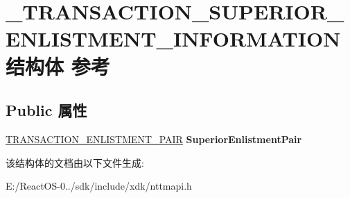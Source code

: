 \hypertarget{struct___t_r_a_n_s_a_c_t_i_o_n___s_u_p_e_r_i_o_r___e_n_l_i_s_t_m_e_n_t___i_n_f_o_r_m_a_t_i_o_n}{}\section{\+\_\+\+T\+R\+A\+N\+S\+A\+C\+T\+I\+O\+N\+\_\+\+S\+U\+P\+E\+R\+I\+O\+R\+\_\+\+E\+N\+L\+I\+S\+T\+M\+E\+N\+T\+\_\+\+I\+N\+F\+O\+R\+M\+A\+T\+I\+O\+N结构体 参考}
\label{struct___t_r_a_n_s_a_c_t_i_o_n___s_u_p_e_r_i_o_r___e_n_l_i_s_t_m_e_n_t___i_n_f_o_r_m_a_t_i_o_n}
\subsection*{Public 属性}
\begin{DoxyCompactItemize}
\item 
\mbox{\label{struct___t_r_a_n_s_a_c_t_i_o_n___s_u_p_e_r_i_o_r___e_n_l_i_s_t_m_e_n_t___i_n_f_o_r_m_a_t_i_o_n_a66f344ad6d18f33f544811be046ff1bf}} 
\hyperlink{struct___t_r_a_n_s_a_c_t_i_o_n___e_n_l_i_s_t_m_e_n_t___p_a_i_r}{T\+R\+A\+N\+S\+A\+C\+T\+I\+O\+N\+\_\+\+E\+N\+L\+I\+S\+T\+M\+E\+N\+T\+\_\+\+P\+A\+IR} {\bfseries Superior\+Enlistment\+Pair}
\end{DoxyCompactItemize}


该结构体的文档由以下文件生成\+:\begin{DoxyCompactItemize}
\item 
E\+:/\+React\+O\+S-\/0../sdk/include/xdk/nttmapi.\+h\end{DoxyCompactItemize}
